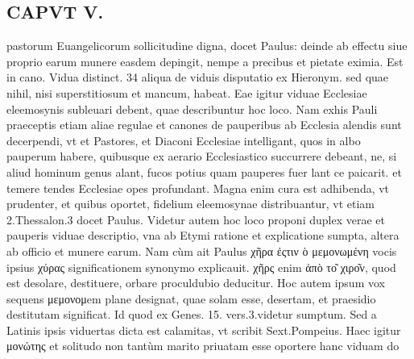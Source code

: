 \documentclass{article}
\begin{document}
\begin{pages}
\section*{CAPVT V. }
\marginpar{[ p.257 ]}\pstart pastorum Euangelicorum sollicitudine digna, docet Paulus: deinde ab effectu siue proprio earum munere easdem depingit, nempe a precibus et pietate eximia. Est in cano. Vidua distinct. 34 aliqua de viduis disputatio ex Hieronym. sed quae nihil, nisi superstitiosum et mancum, habeat. Eae igitur viduae Ecclesiae eleemosynis subleuari debent, quae describuntur hoc loco. Nam exhis Pauli praeceptis etiam aliae regulae et canones de pauperibus ab Ecclesia alendis sunt decerpendi, vt et Pastores, et Diaconi Ecclesiae intelligant, quos in albo pauperum habere, quibusque ex aerario Ecclesiastico succurrere debeant, ne, si aliud hominum genus alant, fucos potius quam pauperes fuer lant ce paicarit. et temere tendes Ecclesiae opes profundant. Magna enim cura est adhibenda, vt prudenter, et quibus oportet, fidelium eleemosynae distribuantur, vt etiam 2.Thessalon.3 docet Paulus.  \pend\pstart Videtur autem hoc loco proponi duplex verae et pauperis viduae descriptio, vna ab Etymi ratione et explicatione sumpta, altera ab officio et munere earum. Nam cùm ait Paulus χῆρα ἐςτιν ὸ μεμονωμένη vocis ipsius χύρας significationem synonymo explicauit. χῆρς enim ἀπὸ το͂ χιρο͂ν, quod est desolare, destituere, orbare proculdubio deducitur. Hoc autem ipsum vox sequens μεμονομem plane designat, quae solam esse, desertam, et praesidio destitutam significat. Id quod ex Genes. 15. vers.3.videtur sumptum. Sed a Latinis ipsis viduertas dicta est calamitas, vt scribit Sext.Pompeius. Haec igitur μονώτης et solitudo non tantùm marito priuatam esse oportere hanc viduam do\pend

\end{pages}
\end{document}
